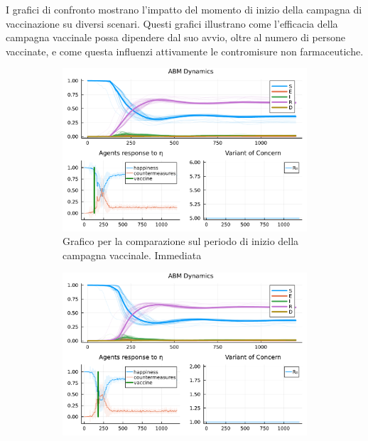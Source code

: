 I grafici di confronto mostrano l'impatto del momento di inizio della 
campagna di vaccinazione su diversi scenari. Questi grafici illustrano 
come l'efficacia della campagna vaccinale possa dipendere dal suo avvio, 
oltre al numero di persone vaccinate, e come questa influenzi attivamente
le contromisure non farmaceutiche.

\begin{figure}[!hb]
	\centering
	\begin{subfigure}[b]{0.45\textwidth}
		\centering
		\includegraphics[width=\textwidth]{img/SocialNetworkABM_5_A.pdf}
		\caption{Grafico per la comparazione sul periodo di inizio della campagna vaccinale. Immediata}
		\label{fig:comparison_all_1}
	\end{subfigure}
	\hfill
	\begin{subfigure}[b]{0.45\textwidth}
		\centering
		\includegraphics[width=\textwidth]{img/SocialNetworkABM_1_A.pdf}

\end{subfigure}
\end{figure}
